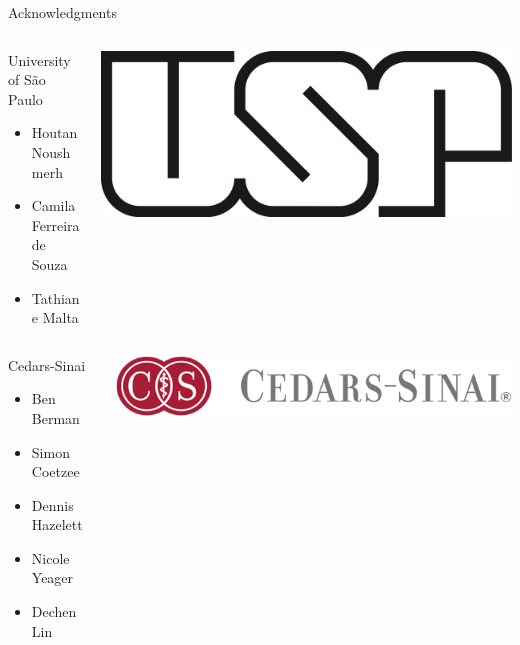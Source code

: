 \documentclass[slidestop,compress,11pt,xcolor=dvipsnames]{beamer}
\begin{document}
\begin{frame}{Acknowledgments}
 \begin{columns}[T]
  \begin{column}{0.5\textwidth}
   \begin{block}{University of São Paulo}
    \begin{itemize}
      \item  Houtan Noushmerh
      \item  Camila Ferreira de Souza
      \item  Tathiane Malta
    \end{itemize}
   \end{block}
  \end{column}
  \begin{column}{0.5\textwidth}
   \vspace{0.2cm}
   \includegraphics[width=0.4\linewidth]{logo/usp.png}
  \end{column}
 \end{columns}

 \vspace{0.2cm}
 \begin{columns}[T]
  \begin{column}{0.5\textwidth}
   \begin{block}{Cedars-Sinai}
    \begin{itemize}
     \item Ben Berman
     \item Simon Coetzee
     \item Dennis Hazelett
     \item Nicole Yeager
     \item Dechen Lin
    \end{itemize}
   \end{block}
  \end{column}
  \begin{column}{0.5\textwidth}
   \vspace{2.5cm}
   \includegraphics[width=1.0\linewidth]{cedars.png}
  \end{column}
 \end{columns}

\end{frame}
\end{document}
